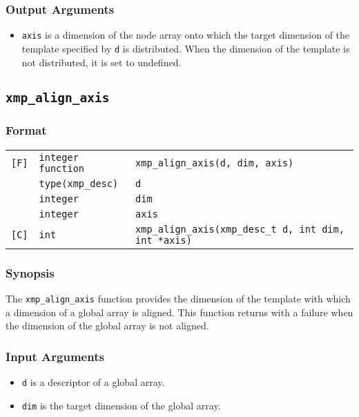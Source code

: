 \subsubsection*{Output Arguments}
\begin{itemize}
 \item {\tt axis} is a dimension of the node array onto which 
       the target dimension of the template specified by {\tt d} is
       distributed. When the dimension of the template is not
       distributed, it is set to undefined.
\end{itemize}


\subsection{\tt xmp\_align\_axis}

\subsubsection*{Format}

\begin{tabular}{lll}

\verb![F]!& {\tt integer function}& {\tt xmp\_align\_axis(d, dim, axis)}\\
          & {\tt type(xmp\_desc)} & {\tt d}\\
          & {\tt integer} & {\tt dim}\\
          & {\tt integer} & {\tt axis}\\

\verb![C]!&  {\tt int}& {\tt xmp\_align\_axis(xmp\_desc\_t d, int dim, int *axis)}\\

\end{tabular}

\subsubsection*{Synopsis}

The {\tt xmp\_align\_axis} function provides the dimension of the
template with which a dimension of a global array is aligned. This
function returns with a failure when the dimension of the global array is
not aligned.

\subsubsection*{Input Arguments}
\begin{itemize}
 \item {\tt d} is a descriptor of a global array.
 \item {\tt dim} is the target dimension of the global array.
\end{itemize}

